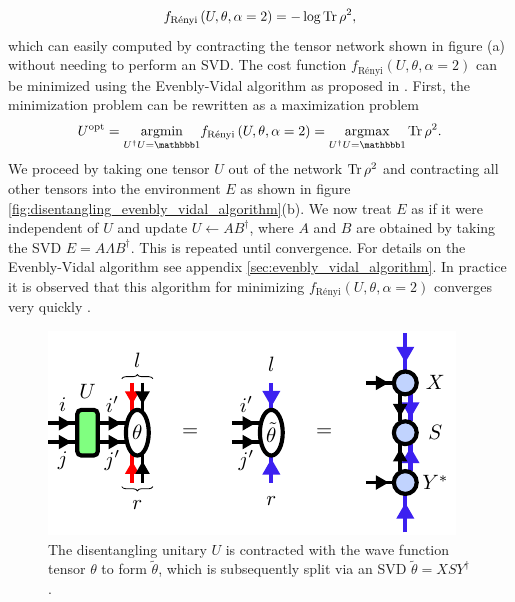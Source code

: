 \begin{equation}
	\label{eq:renyi_entropy_alpha_2}
	f_\text{Rényi}\left(U,\theta,\alpha=2\right) = -\log\operatorname{Tr}\rho^2,
\end{equation}
which can easily computed by contracting the tensor network shown in figure (a) without needing to perform an SVD. The cost function $f_\text{Rényi}\left(U,\theta,\alpha=2\right)$ can be minimized using the Evenbly-Vidal algorithm as proposed in \cite{cite:finding_purifications_with_minimal_entanglement}. First, the minimization problem can be rewritten as a maximization problem
\begin{equation}
	U^\text{opt} = \underset{U^\dagger U = \id}{\argmin} f_\text{Rényi}\left(U,\theta,\alpha=2\right) = \underset{U^\dagger U = \id}{\argmax}\Tr\rho^2.
\end{equation}
We proceed by taking one tensor $U$ out of the network $\operatorname{Tr}\rho^2$ and contracting all other tensors into the environment $E$ as shown in figure \ref{fig:disentangling_evenbly_vidal_algorithm}(b). We now treat $E$ as if it were independent of $U$ and update $U\leftarrow AB^\dagger$, where $A$ and $B$ are obtained by taking the SVD $E=A\Lambda B^\dagger$. This is repeated until convergence. For details on the Evenbly-Vidal algorithm see appendix \ref{sec:evenbly_vidal_algorithm}. In practice it is observed that this algorithm for minimizing $f_\text{Rényi}\left(U,\theta,\alpha=2\right)$ converges very quickly \cite{cite:efficient_simulation_of_dynamics_in_two_dimensional_quantum_spin_systems}.\par
\begin{figure}
	\centering
	\includegraphics[scale=1]{figures/tikz/disoTPS/theta_tilde_contraction/theta_tilde_contraction.pdf}
	\caption{The disentangling unitary $U$ is contracted with the wave function tensor $\theta$ to form $\tilde{\theta}$, which is subsequently split via an SVD $\tilde{\theta} = XSY^\dagger$.}
	\label{fig:disentangling_theta_definition}
\end{figure}
